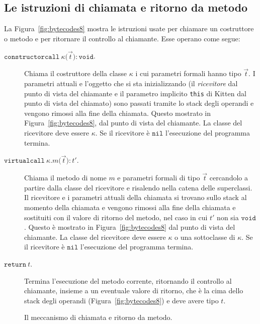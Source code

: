 \subsection{Le istruzioni di chiamata e ritorno da metodo}
  \label{subsec:call_return}
%
La Figura~\ref{fig:bytecodes8} mostra le istruzioni usate per chiamare
un costruttore o metodo e per ritornare il controllo al chiamante.
Esse operano come segue:
%
\begin{description}
\item[\underline{$\mathtt{constructorcall\ \kappa(}$$\vec{t}$$\mathtt{):void}$}.]
  Chiama il costruttore della classe $\kappa$ i cui parametri formali hanno
  tipo $\vec{t}$. I parametri attuali e l'oggetto che si sta inizializzando
  (\cioe il \emph{ricevitore} dal punto di vista del chiamante e
  il parametro implicito \texttt{this} di Kitten dal punto di vista del
  chiamato) sono passati
  tramite lo stack degli operandi e vengono rimossi alla fine
  della chiamata. Questo \e mostrato in Figura~\ref{fig:bytecodes8}, dal punto
  di vista del chiamante. La classe del ricevitore deve essere $\kappa$.
  Se il ricevitore \`e $\mathtt{nil}$ l'esecuzione del programma termina.
\item[\underline{$\mathtt{virtualcall\ \kappa.\mathit{m}
  (}$$\vec{t}$$\mathtt{):\mathit{t'}}$}.]
  Chiama il metodo di nome $m$ e parametri formali di tipo $\vec{\mathit{t}}$
  cercandolo a partire dalla classe del ricevitore e risalendo nella
  catena delle superclassi. Il ricevitore e i parametri attuali della chiamata
  si trovano sullo stack al momento della chiamata e vengono rimossi
  alla fine della chiamata e sostituiti con il valore di ritorno del metodo,
  nel caso in cui $\mathit{t'}$ non sia $\mathtt{void}$. Questo \`e
  mostrato in Figura~\ref{fig:bytecodes8} dal punto di vista del chiamante.
  La classe del ricevitore deve essere $\kappa$ o una sottoclasse di $\kappa$.
  Se il ricevitore \`e $\mathtt{nil}$ l'esecuzione del programma termina.
\item[\underline{$\mathtt{return\ \mathit{t}}$}.]
  Termina l'esecuzione del metodo corrente, ritornando il controllo al
  chiamante, insieme a un eventuale valore di ritorno, che \`e la cima dello
  stack degli operandi (Figura~\ref{fig:bytecodes8}) e deve avere tipo $t$.
\end{description}
%
\begin{figure}[t]
\begin{center}
\end{center}
\caption{Il meccanismo di chiamata e ritorno da metodo.}
  \label{fig:callercallee}
\end{figure}

